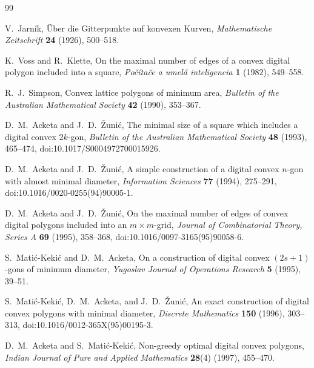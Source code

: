 \documentclass[11pt]{article}
\theoremstyle{definition}
\begin{document}
\begin{thebibliography}{99}

V.~Jarník,
\newblock Über die Gitterpunkte auf konvexen Kurven,
\newblock \emph{Mathematische Zeitschrift} \textbf{24} (1926), 500--518.

K.~Voss and R.~Klette,
\newblock On the maximal number of edges of a convex digital polygon included into a square,
\newblock \emph{Počítače a umelá inteligencia} \textbf{1} (1982), 549--558.

R.~J.~Simpson,
\newblock Convex lattice polygons of minimum area,
\newblock \emph{Bulletin of the Australian Mathematical Society} \textbf{42} (1990), 353--367.

D.~M.~Acketa and J.~D.~Žunić,
\newblock The minimal size of a square which includes a digital convex \(2k\)-gon,
\newblock \emph{Bulletin of the Australian Mathematical Society} \textbf{48} (1993), 465--474,
\newblock doi:10.1017/S0004972700015926.

D.~M.~Acketa and J.~D.~Žunić,
\newblock A simple construction of a digital convex \(n\)-gon with almost minimal diameter,
\newblock \emph{Information Sciences} \textbf{77} (1994), 275--291,
\newblock doi:10.1016/0020-0255(94)90005-1.

D.~M.~Acketa and J.~D.~Žunić,
\newblock On the maximal number of edges of convex digital polygons included into an \(m\times m\)-grid,
\newblock \emph{Journal of Combinatorial Theory, Series A} \textbf{69} (1995), 358--368,
\newblock doi:10.1016/0097-3165(95)90058-6.

S.~Matić-Kekić and D.~M.~Acketa,
\newblock On a construction of digital convex \((2s+1)\)-gons of minimum diameter,
\newblock \emph{Yugoslav Journal of Operations Research} \textbf{5} (1995), 39--51.

S.~Matić-Kekić, D.~M.~Acketa, and J.~D.~Žunić,
\newblock An exact construction of digital convex polygons with minimal diameter,
\newblock \emph{Discrete Mathematics} \textbf{150} (1996), 303--313,
\newblock doi:10.1016/0012-365X(95)00195-3.

D.~M.~Acketa and S.~Matić-Kekić,
\newblock Non-greedy optimal digital convex polygons,
\newblock \emph{Indian Journal of Pure and Applied Mathematics} \textbf{28}(4) (1997), 455--470.

\end{thebibliography}
\end{document}

